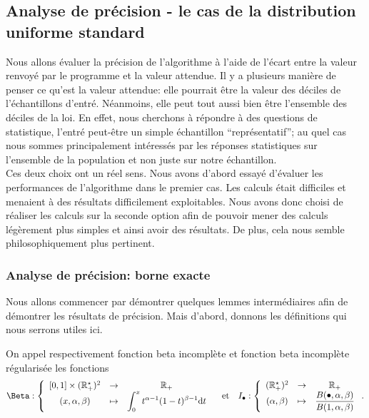 \subsection{Analyse de précision - le cas de la distribution uniforme standard}

Nous allons évaluer la précision de l'algorithme à l'aide de l'écart entre la valeur renvoyé par le programme et la valeur attendue. Il y a plusieurs manière de penser ce qu'est la valeur attendue: elle pourrait être la valeur des déciles de l'échantillons d'entré. Néanmoins, elle peut tout aussi bien être l'ensemble des déciles de la loi. En effet, nous cherchons à répondre à des questions de statistique, l'entré peut-être un simple échantillon ``représentatif'';  au quel cas nous sommes principalement intéressés par les réponses statistiques sur l'ensemble de la population et non juste sur notre échantillon.\\

Ces deux choix ont un réel sens. Nous avons d'abord essayé d'évaluer les performances de l'algorithme dans le premier cas. Les calculs était difficiles et menaient à des résultats difficilement exploitables. Nous avons donc choisi de réaliser les calculs sur la seconde option afin de pouvoir mener des calculs légèrement plus simples et ainsi avoir des résultats. De plus, cela nous semble philosophiquement plus pertinent.

\subsubsection{Analyse de précision: borne exacte}

Nous allons commencer par démontrer quelques lemmes intermédiaires afin de démontrer les résultats de précision. Mais d'abord, donnons les définitions qui nous serrons utiles ici.

\begin{definition}
    On appel respectivement fonction beta incomplète et fonction beta incomplète régularisée les fonctions 
    \[
        \Beta : \left\{ 
            \begin{array}[]{ccc}
                [0,1] \times (\R_+^\star)^2 & \to & \R_+\\
                (x, \alpha, \beta) & \mapsto & \displaystyle\int_0^x t^{\alpha - 1} (1 - t)^{\beta -1} \dt t
            \end{array}
        \right. \quad \text{et} \quad  I_\bullet : \left\{ 
            \begin{array}[]{ccc}
                (\R_+^\star)^2 & \to & \R_+\\
                (\alpha, \beta) & \mapsto & \dfrac{B(\bullet, \alpha, \beta)}{B(1, \alpha, \beta)}
            \end{array}
        \right.  .
    \]
\end{definition}

